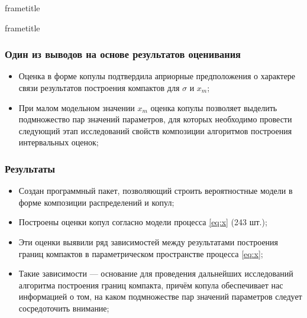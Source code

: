 \documentclass[11pt]{beamer}
\begin{document}
{
  \nointerlineskip
  \begin{beamercolorbox}[wd=\paperwidth,leftskip=0.3cm,rightskip=0.3cm,ht=2.5ex,dp=1.5ex]{frametitle}
    \scshape \protect\insertframetitle%
  \end{beamercolorbox}%

  \if@useTitleProgressBar
    \nointerlineskip
    \begin{beamercolorbox}[wd=\paperwidth,ht=0.4pt,dp=0pt]{frametitle}
      \progressbar{\paperwidth}
    \end{beamercolorbox}
  \fi
}
\makeatother

\begin{frame}
\begin{center}
\frametitle{Один из выводов на основе результатов оценивания}
\begin{itemize}
  \item Оценка в форме копулы подтвердила априорные предположения о характере связи результатов построения компактов для $\sigma$ и $x_m$;
  \item При малом модельном значении $x_m$ оценка копулы позволяет выделить подмножество пар значений параметров, для которых необходимо провести следующий этап исследований свойств композиции алгоритмов построения интервальных оценок;
\end{itemize}
\end{center}
\end{frame}

\begin{frame}
\begin{center}
\frametitle{Результаты}
\begin{itemize}
  \item Создан программный пакет, позволяющий строить вероятностные модели в форме композиции распределений и копул;
  \item Построены оценки копул согласно модели процесса \eqref{eq:x} (243 шт.);
  \item Эти оценки выявили ряд зависимостей между результатами построения границ компактов в параметрическом пространстве процесса \eqref{eq:x};
  \item Такие зависимости --- основание для проведения дальнейших исследований алгоритма построения границ компакта, причём копула обеспечивает нас информацией о том, на каком подмножестве пар значений параметров следует сосредоточить внимание;
\end{itemize}
\end{center}
\end{frame}
\end{document}
